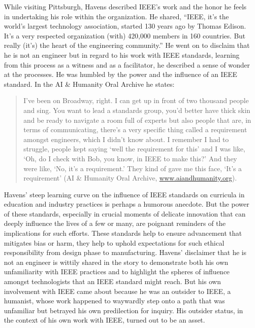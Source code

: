 \documentclass[11pt,dvipdfm]{article}
\begin{document}
While visiting Pittsburgh, Havens described IEEE’s work and the honor he feels in undertaking his role within the organization.  He shared, “IEEE, it’s the world’s largest technology association, started 130 years ago by Thomas Edison.  It’s a very respected organization (with) 420,000 members in 160 countries.  But really (it’s) the heart of the engineering community.”  He went on to disclaim that he is not an engineer but in regard to his work with IEEE standards, learning from this process as a witness and as a facilitator, he described a sense of wonder at the processes.  He was humbled by the power and the influence of an IEEE standard.  In the AI \& Humanity Oral Archive he states:
\begin{quote}
	I’ve been on Broadway, right.  I can get up in front of two thousand people and sing.  You want to lead a standards group, you’d better have thick skin and be ready to navigate a room full of experts but also people that are, in terms of communicating, there’s a very specific thing called a requirement amongst engineers, which I didn’t know about.  I remember I had to struggle, people kept saying ‘well the requirement for this’ and I was like, ‘Oh, do I check with Bob, you know, in IEEE to make this?’ And they were like, ‘No, it’s a requirement.’  They kind of gave me this face, ‘It’s a requirement’ (AI \& Humanity Oral Archive, \url{www.aiandhumanity.org}).
\end{quote}
Havens’ steep learning curve on the influence of IEEE standards on curricula in education and industry practices is perhaps a humorous anecdote.  But the power of these standards, especially in crucial moments of delicate innovation that can deeply influence the lives of a few or many, are poignant reminders of the implications for such efforts.  These standards help to ensure advancement that mitigates bias or harm, they help to uphold expectations for such ethical responsibility from design phase to manufacturing.  Havens’ disclaimer that he is not an engineer is wittily shared in the story to demonstrate both his own unfamiliarity with IEEE practices and to highlight the spheres of influence amongst technologists that an IEEE standard might reach.  But his own involvement with IEEE came about because he was an outsider to IEEE, a humanist, whose work happened to waywardly step onto a path that was unfamiliar but betrayed his own predilection for inquiry.  His outsider status, in the context of his own work with IEEE, turned out to be an asset. 
\end{document}
